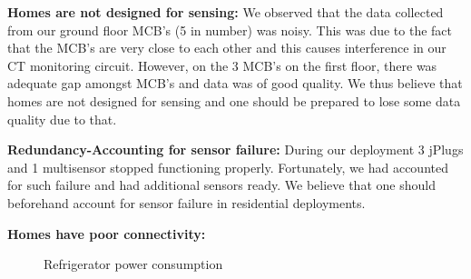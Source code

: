 \documentclass[10pt]{sensys-proc}
\begin{document}
\noindent \textbf{Homes are not designed for sensing:} We observed that the data collected from our ground floor MCB's (5 in number) was noisy. This was due to the fact that the MCB's are very close to each other and this causes interference in our CT monitoring circuit. However, on the 3 MCB's on the first floor, there was adequate gap amongst MCB's and data was of good quality. We thus believe that homes are not designed for sensing and one should be prepared to lose some data quality due to that.

\noindent \textbf{Redundancy-Accounting for sensor failure:} During our deployment 3 jPlugs and 1 multisensor stopped functioning properly. Fortunately, we had accounted for such failure and had additional sensors ready. We believe that one should beforehand  account for sensor failure in residential deployments.

\noindent \textbf{Homes have poor connectivity:}

\begin{figure}
       
   
    \caption{Refrigerator power consumption}

    \label{fig:metadata}

\end{figure}
\end{document}
